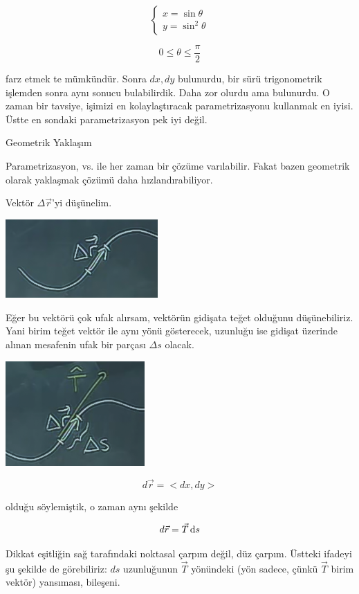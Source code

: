 \documentclass[12pt,fleqn]{article}\usepackage{../../common}
\begin{document}
$$ 
\left\{ \begin{array}{l}
x  = \sin\theta \\
y  = \sin^2\theta 
\end{array} \right.
$$

$$ 0 \le \theta \le \frac{\pi}{2} $$

farz etmek te mümkündür. Sonra $dx,dy$ bulunurdu, bir sürü trigonometrik
işlemden sonra aynı sonucu bulabilirdik. Daha zor olurdu ama bulunurdu. O
zaman bir tavsiye, işimizi en kolaylaştıracak parametrizasyonu kullanmak en
iyisi. Üstte en sondaki parametrizasyon pek iyi değil. 

Geometrik Yaklaşım

Parametrizasyon, vs. ile her zaman bir çözüme varılabilir. Fakat bazen
geometrik olarak yaklaşmak çözümü daha hızlandırabiliyor. 

Vektör $\Delta \vec{r}$'yi düşünelim. 

\includegraphics[height=3cm]{19_11.png}

Eğer bu vektörü çok ufak alırsam, vektörün gidişata teğet olduğunu
düşünebiliriz. Yani birim teğet vektör ile aynı yönü gösterecek, uzunluğu
ise gidişat üzerinde alınan mesafenin ufak bir parçası $\Delta s$ olacak. 

\includegraphics[height=4cm]{19_12.png}

$$ d\vec{r} = <dx, dy> $$
 
olduğu söylemiştik, o zaman aynı şekilde

$$  d\vec{r} = \vec{T} \,\mathrm{d} s $$

Dikkat eşitliğin sağ tarafındaki noktasal çarpım değil, düz çarpım. Üstteki
ifadeyi şu şekilde de görebiliriz: $ds$ uzunluğunun $\vec{T}$ yönündeki
(yön sadece, çünkü $\vec{T}$ birim vektör) yansıması, bileşeni.
\end{document}
